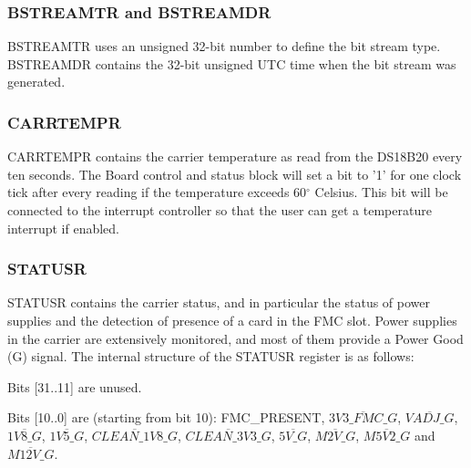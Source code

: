 \documentclass[a4paper]{article}
\newenvironment{packed_item}{
\begin{itemize}
  \setlength{\itemsep}{1pt}
  \setlength{\parskip}{0pt}
  \setlength{\parsep}{0pt}
}{\end{itemize}}
\begin{document}
\subsubsection{BSTREAMTR and BSTREAMDR}
BSTREAMTR uses an unsigned 32-bit number to define the bit stream type. BSTREAMDR contains the 32-bit unsigned UTC time when the bit stream was generated. 

\subsubsection{CARRTEMPR}
CARRTEMPR contains the carrier temperature as read from the DS18B20 every ten seconds. The Board control and status block will set a bit to '1' for one clock tick after every reading if the temperature exceeds 60$^\circ$ Celsius. This bit will be connected to the interrupt controller so that the user can get a temperature interrupt if enabled. 

\subsubsection{STATUSR}
STATUSR contains the carrier status, and in particular the status of power supplies and the detection of presence of a card in the FMC slot. Power supplies in the carrier are extensively monitored, and most of them provide a Power Good (G) signal. The internal structure of the STATUSR register is as follows:
\begin{packed_item}
\item Bits [31..11] are unused.
\item Bits [10..0] are (starting from bit 10): FMC\_PRESENT, $\overline{3V3\_FMC\_G}$,  $\overline{VADJ\_G}$, $\overline{1V8\_G}$,  $\overline{1V5\_G}$,  $\overline{CLEAN\_1V8\_G}$, $\overline{CLEAN\_3V3\_G}$, $\overline{5V\_G}$, \linebreak$\overline{M2V\_G}$, $\overline{M5V2\_G}$ and $\overline{M12V\_G}$.
\end{packed_item}
\end{document}
